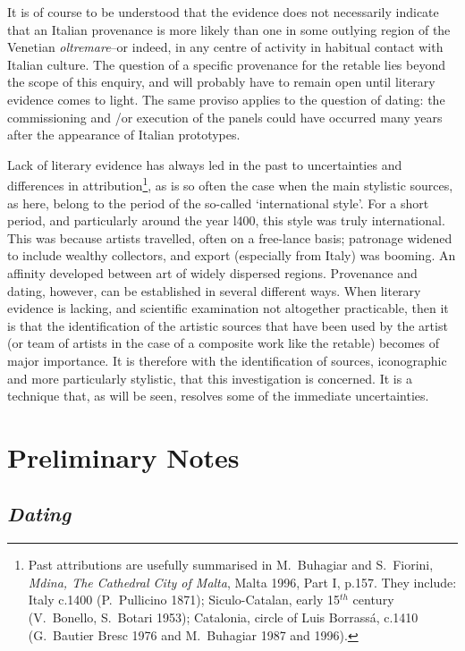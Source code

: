 \documentclass[a4paper,12pt]{article}
\begin{document}
It is of course to be understood that the evidence does not
necessarily indicate that an Italian provenance is more likely than
one in some outlying region of the Venetian \textit{oltremare}--or
indeed, in any centre of activity in habitual contact with Italian
culture.  The question of a specific provenance for the retable lies
beyond the scope of this enquiry, and will probably have to remain
open until literary evidence comes to light. The same proviso applies
to the question of dating: the commissioning and /or execution of the
panels could have occurred many years after the appearance of Italian
prototypes.

Lack of literary evidence has always led in the past to uncertainties
and differences in attribution\footnote{Past attributions are usefully
summarised in M.~Buhagiar and S.~Fiorini, \textit{Mdina, The Cathedral
City of Malta}, Malta 1996, Part I, p.157. They include: Italy c.1400
(P.~Pullicino 1871); Siculo-Catalan, early 15$^{th}$ century
(V.~Bonello, S.~Botari 1953); Catalonia, circle of Luis Borrassá, c.1410
(G.~Bautier Bresc 1976 and M.~Buhagiar 1987 and 1996).}, as is so
often the case when the main stylistic sources, as here, belong to the
period of the so-called `international style'. For a short period, and
particularly around the year l400, this style was truly
international. This was because artists travelled, often on a
free-lance basis; patronage widened to include wealthy collectors, and
export (especially from Italy) was booming. An affinity developed
between art of widely dispersed regions.  Provenance and dating,
however, can be established in several different ways. When literary
evidence is lacking, and scientific examination not altogether
practicable, then it is that the identification of the artistic
sources that have been used by the artist (or team of artists in the
case of a composite work like the retable) becomes of major
importance. It is therefore with the identification of sources,
iconographic and more particularly stylistic, that this investigation
is concerned.  It is a technique that, as will be seen, resolves some
of the immediate uncertainties.

\section{Preliminary Notes}

\subsection{\textit{Dating}}
\end{document}
